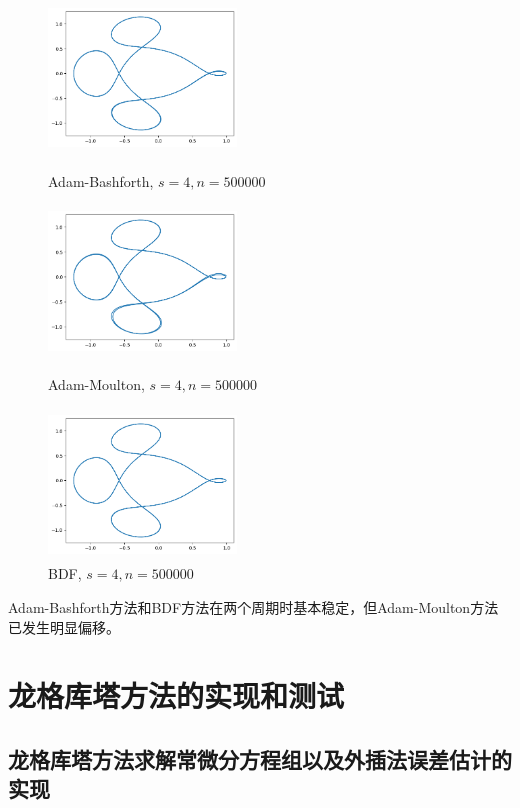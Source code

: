 \documentclass{ctexart}
\begin{document}
\begin{figure}[htbp]
	\begin{minipage}{5cm}
		\centering
		\includegraphics[width = 5cm, height = 4cm]{11.png}
		\caption{Adam-Bashforth, $s=4,n=500000$}
		\label{11}
	\end{minipage}
	\begin{minipage}{5cm}
		\centering
		\includegraphics[width = 5cm, height = 4cm]{12.png}
		\caption{Adam-Moulton, $s=4,n=500000$}
		\label{12}
	\end{minipage}
	\begin{minipage}{5cm}
		\centering
		\includegraphics[width = 5cm, height = 4cm]{13.png}
		\caption{BDF, $s=4,n=500000$}
		\label{13}
	\end{minipage}
\end{figure}

Adam-Bashforth方法和BDF方法在两个周期时基本稳定，但Adam-Moulton方法已发生明显偏移。

\section{龙格库塔方法的实现和测试}

\subsection{龙格库塔方法求解常微分方程组以及外插法误差估计的实现}
\end{document}

